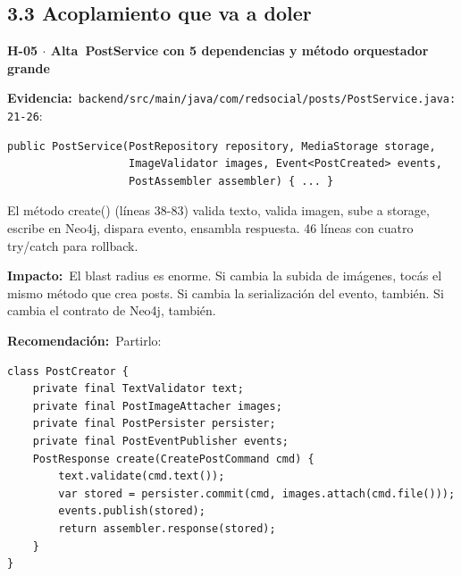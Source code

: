 \documentclass[10pt,a4paper]{article}
\newcommand{\code}[1]{\nolinkurl{#1}}
\newcommand{\badgeAlta}{\colorbox{orange!20}{\textcolor{orange!90!black}{\textbf{\footnotesize Alta}}}}
\begin{document}
\subsection{3.3 Acoplamiento que va a doler}
\vspace{0.8em}\noindent\textbf{\large H-05 $\cdot$ \badgeAlta\  PostService con 5 dependencias y método orquestador grande}\par\vspace{0.3em}
\noindent\textbf{Evidencia:}\ \code{backend/src/main/java/com/redsocial/posts/PostService.java:21-26}:\par\vspace{0.4em}
\begin{tcolorbox}[colback=codebg,colframe=gray!40,arc=1mm]\small
\begin{verbatim}
public PostService(PostRepository repository, MediaStorage storage, 
                   ImageValidator images, Event<PostCreated> events, 
                   PostAssembler assembler) { ... }
\end{verbatim}
\end{tcolorbox}\vspace{0.4em}
El método create() (líneas 38-83) valida texto, valida imagen, sube a storage, escribe en Neo4j, dispara evento, ensambla respuesta. 46 líneas con cuatro try/catch para rollback.\par\vspace{0.4em}
\noindent\textbf{Impacto:}\ El blast radius es enorme. Si cambia la subida de imágenes, tocás el mismo método que crea posts. Si cambia la serialización del evento, también. Si cambia el contrato de Neo4j, también.\par\vspace{0.4em}
\noindent\textbf{Recomendación:}\ Partirlo:\par\vspace{0.4em}
\begin{tcolorbox}[colback=codebg,colframe=gray!40,arc=1mm]\small
\begin{verbatim}
class PostCreator {
    private final TextValidator text;
    private final PostImageAttacher images;
    private final PostPersister persister;
    private final PostEventPublisher events;
    PostResponse create(CreatePostCommand cmd) {
        text.validate(cmd.text());
        var stored = persister.commit(cmd, images.attach(cmd.file()));
        events.publish(stored);
        return assembler.response(stored);
    }
}
\end{verbatim}
\end{tcolorbox}\vspace{0.4em}
\end{document}
